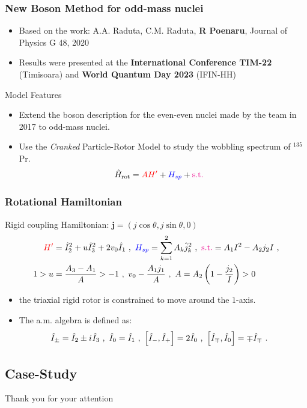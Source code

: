 \documentclass{beamer}
\newcommand{\iu}{{i\mkern1mu}}
\begin{document}
\begin{frame}
	\frametitle{New Boson Method for odd-mass nuclei}
	\begin{itemize}
		\item Based on the work: A.A. Raduta, C.M. Raduta, \textbf{R Poenaru}, Journal of Physics G 48, 2020
		\item Results were presented at the \textbf{International Conference TIM-22} (Timisoara) and \textbf{World Quantum Day 2023} (IFIN-HH)
	\end{itemize}
	\begin{alertblock}{Model Features}
		\begin{itemize}
			\item Extend the boson description for the even-even nuclei made by the team in 2017 to odd-mass nuclei.
			\item Use the \emph{Cranked} Particle-Rotor Model to study the wobbling spectrum of $^{135}$Pr.
			\begin{align}
				\hat{H}_\text{rot}&={\color{red}AH'}+{\color{blue}H_{sp}}+{\color{magenta}\text{s.t.}}
			\end{align}
		\end{itemize}
	\end{alertblock}
\end{frame}

\begin{frame}
	\frametitle{Rotational Hamiltonian}
	\begin{exampleblock}{Rigid coupling Hamiltonian: $\mathbf{j}=(j\cos\theta,j\sin\theta,0)$}
		\begin{align}
			{\color{red}H'}&=\hat{I}_2^2+u\hat{I}_3^2+2v_0\hat{I}_1\ ,\ {\color{blue}H_{sp}}=\sum_{k=1}^2A_k\hat{j}_k^2\ ,\ {\color{magenta}\text{s.t.}}=A_1I^2-A_2j_2I\ ,\nonumber\\
			1>u&=\frac{A_3-A_1}{A}>-1\ ,\ v_0-\frac{A_1j_1}{A}\ ,\ A=A_2\left(1-\frac{j_2}{I}\right)>0\nonumber
		\end{align}
	\end{exampleblock}
	\begin{itemize}
		\item the triaxial rigid rotor is constrained to move around the $1$-axis.
		\item The a.m. algebra is defined as:
		\begin{align}
			\hat{I}_\pm=\hat{I}_2\pm \iu\hat{I}_3\ &,\ \hat{I}_0=\hat{I}_1\ ,\ \left[\hat{I}_-,\hat{I}_+\right]=2\hat{I}_0\ ,\ \left[\hat{I}_\mp,\hat{I}_0\right]=\mp\hat{I}_\mp\ .\nonumber
		\end{align}
	\end{itemize}
\end{frame}

\subsection{Case-Study}

\begin{frame}[plain] %
	\begin{center}
		\bigskip\bigskip %
		{\Huge Thank you for your attention \faHeart}
	\end{center}
\end{frame}
\end{document}
